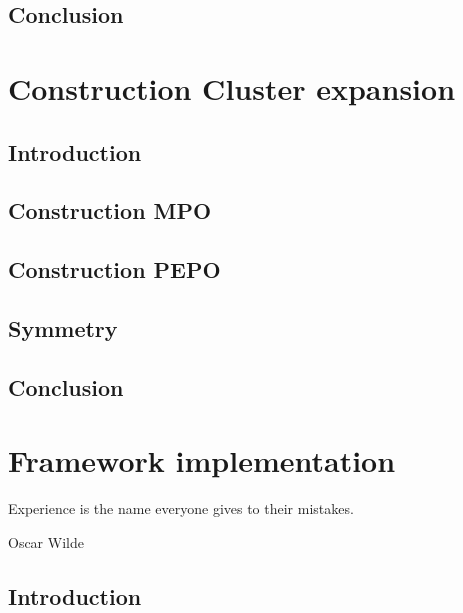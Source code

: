 \documentclass{book}
\newcounter{a}
\newcounter{b}
\begin{document}
\section{Conclusion}


\chapter{Construction Cluster expansion} \label{chap4}

\section{Introduction}


\section{Construction MPO}\label{H4_mpo_cons}


\section{Construction PEPO}\label{H4_pepo_cons}


\section{Symmetry}\label{sec:symm}


\section{Conclusion}


\chapter{Framework implementation}\label{chap5}



\epigraph{Experience is the name everyone gives to their mistakes.}{Oscar Wilde}

\section{Introduction}

\end{document}
